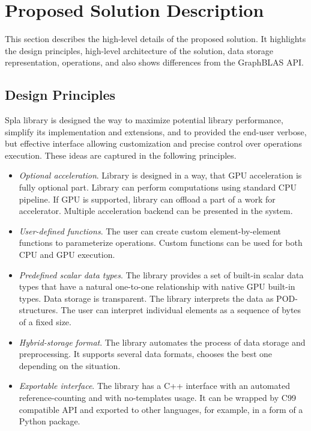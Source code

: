 \section{Proposed Solution Description}

This section describes the high-level details of the proposed solution. 
It highlights the design principles, high-level architecture of the solution, data storage representation, operations, and also shows differences from the GraphBLAS API.

\subsection{Design Principles}

Spla library is designed the way to maximize potential library performance, simplify its implementation and extensions, and to provided the end-user verbose, but effective interface allowing customization and precise control over operations execution. 
These ideas are captured in the following principles.

\begin{itemize}
    \item \textit{Optional acceleration}. Library is designed in a way, that GPU acceleration is fully optional part. Library can perform computations using standard CPU pipeline. If GPU is supported, library can offload a part of a work for accelerator. Multiple acceleration backend can be presented in the system.
    \item \textit{User-defined functions}. The user can create custom element-by-element functions to parameterize operations. Custom functions can be used for both CPU and GPU execution.
    \item \textit{Predefined scalar data types}. The library provides a set of built-in scalar data types that have a natural one-to-one relationship with native GPU built-in types. Data storage is transparent. The library interprets the data as POD-structures. The user can interpret individual elements as a sequence of bytes of a fixed size.
    \item \textit{Hybrid-storage format}. The library automates the process of data storage and preprocessing. It supports several data formats, chooses the best one depending on the situation.
    \item \textit{Exportable interface}. The library has a C++ interface with an automated reference-counting and with no-templates usage. It can be wrapped by C99 compatible API and exported to other languages, for example, in a form of a Python package.
\end{itemize}

